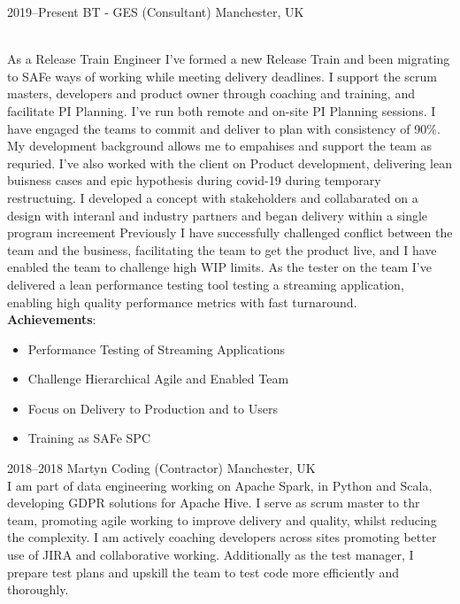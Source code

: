 \documentclass[]{cv-style}          %
\begin{document}
\begin{entrylist}
\entry
  {2019--Present}
  {BT - GES (Consultant)}
  {Manchester, UK}
  {\\
  As a Release Train Engineer I've formed a new Release Train and been migrating to SAFe ways of working while meeting delivery deadlines. I support the scrum masters, developers and product owner through coaching and training, and facilitate PI Planning. I've run both remote and on-site PI Planning sessions. I have engaged the teams to commit and deliver to plan with consistency of 90\%. My development background allows me to empahises and support the team as requried.
  I've also worked with the client on Product development, delivering lean buisness cases and epic hypothesis during covid-19 during temporary restructuing. I developed a concept with stakeholders and collabarated on a design with interanl and industry partners and began delivery within a single program increement
  Previously I have successfully challenged conflict between the team and the business, facilitating the team to get the product live, and I have enabled the team to challenge high WIP limits.
  As the tester on the team I've delivered a lean performance testing tool testing a streaming application, enabling high quality performance metrics with fast turnaround.
  \\
  \textbf{Achievements}:
  \begin{itemize}
    \item Performance Testing of Streaming Applications
    \item Challenge Hierarchical Agile and Enabled Team
    \item Focus on Delivery to Production and to Users
    \item Training as SAFe SPC
  \end{itemize}
  }
\entry
  {2018--2018}
  {Martyn Coding (Contractor)}
  {Manchester, UK}
  {\\
  I am part of data engineering working on Apache Spark, in Python and Scala, developing GDPR solutions for Apache Hive.
  I serve as scrum master to thr team, promoting agile working to improve delivery and quality, whilst reducing the complexity.
  I am actively coaching developers across sites promoting better use of JIRA and collaborative working.
  Additionally as the test manager, I prepare test plans and upskill the team to test code more efficiently and thoroughly.
}
\end{entrylist}
\end{document}
